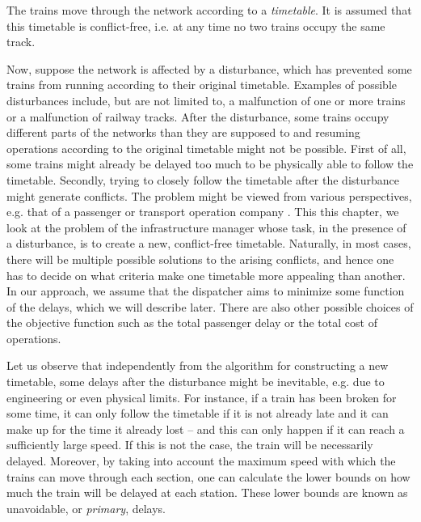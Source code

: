 The trains move through the network according to a \emph{timetable}. It is
assumed that this timetable is conflict-free, i.e. at any time no two trains
occupy the same track.

Now, suppose the network is affected by a disturbance, which has prevented some
trains from running according to their original timetable. Examples of possible
disturbances include, but are not limited to, a malfunction of one or more
trains or a malfunction of railway tracks. After the disturbance, some trains
occupy different parts of the networks than they are supposed to and resuming
operations according to the original timetable might not be possible. First of
all, some trains might already be delayed too much to be physically able to
follow the timetable. Secondly, trying to closely follow the timetable after
the disturbance might generate conflicts. The problem might be viewed from
various perspectives, e.g. that of a passenger or transport operation company
\cite{tornquist,lamorgese,Jensen2016}. This this chapter, we look at the
problem of the infrastructure manager whose task, in the presence of a
disturbance, is to create a new, conflict-free timetable. Naturally, in most
cases, there will be multiple possible solutions to the arising conflicts, and
hence one has to decide on what criteria make one timetable more appealing than
another. In our approach, we assume that the dispatcher aims to minimize some
function of the delays, which we will describe later. There are also other
possible choices of the objective function \cite{8795577} such as the total
passenger delay or the total cost of operations.

Let us observe that independently from the algorithm for constructing a new
timetable, some delays after the disturbance might be inevitable, e.g. due to
engineering or even physical limits. For instance, if a train has been broken
for some time, it can only follow the timetable if it is not already late and
it can make up for the time it already lost -- and this can only happen if it
can reach a sufficiently large speed. If this is not the case, the train will
be necessarily delayed. Moreover, by taking into account the maximum speed with
which the trains can move through each section, one can calculate the lower
bounds on how much the train will be delayed at each station. These lower
bounds are known as unavoidable, or \emph{primary}, delays.

